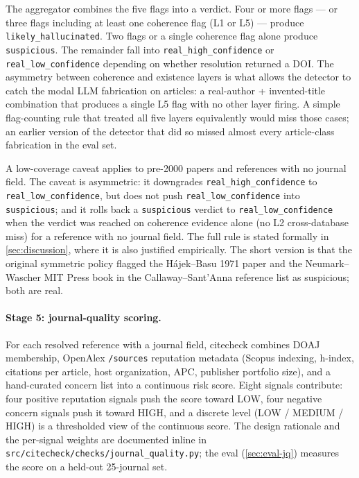 \documentclass[12pt]{article}
\begin{document}
The aggregator combines the five flags into a verdict. Four or more flags --- or three flags including at least one coherence flag (L1 or L5) --- produce \texttt{likely\_hallucinated}. Two flags or a single coherence flag alone produce \texttt{suspicious}. The remainder fall into \texttt{real\_high\_confidence} or \texttt{real\_low\_confidence} depending on whether resolution returned a DOI. The asymmetry between coherence and existence layers is what allows the detector to catch the modal LLM fabrication on articles: a real-author + invented-title combination that produces a single L5 flag with no other layer firing. A simple flag-counting rule that treated all five layers equivalently would miss those cases; an earlier version of the detector that did so missed almost every article-class fabrication in the eval set.

A low-coverage caveat applies to pre-2000 papers and references with no journal field. The caveat is asymmetric: it downgrades \texttt{real\_high\_confidence} to \texttt{real\_low\_confidence}, but does not push \texttt{real\_low\_confidence} into \texttt{suspicious}; and it rolls back a \texttt{suspicious} verdict to \texttt{real\_low\_confidence} when the verdict was reached on coherence evidence alone (no L2 cross-database miss) for a reference with no journal field. The full rule is stated formally in \cref{sec:discussion}, where it is also justified empirically. The short version is that the original symmetric policy flagged the Hájek--Basu 1971 paper and the Neumark--Wascher MIT Press book in the Callaway--Sant'Anna \citep{callaway_santanna_2021_preprint} reference list as suspicious; both are real.

\paragraph{Stage 5: journal-quality scoring.} For each resolved reference with a journal field, citecheck combines DOAJ membership, OpenAlex \texttt{/sources} reputation metadata (Scopus indexing, h-index, citations per article, host organization, APC, publisher portfolio size), and a hand-curated concern list into a continuous risk score. Eight signals contribute: four positive reputation signals push the score toward LOW, four negative concern signals push it toward HIGH, and a discrete level (LOW / MEDIUM / HIGH) is a thresholded view of the continuous score. The design rationale and the per-signal weights are documented inline in \texttt{src/citecheck/checks/journal\_quality.py}; the eval (\cref{sec:eval-jq}) measures the score on a held-out 25-journal set.
\end{document}
